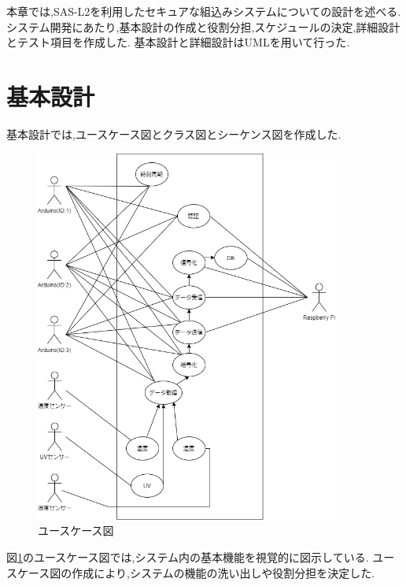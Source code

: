 
本章では,SAS-L2を利用したセキュアな組込みシステムについての設計を述べる.
システム開発にあたり,基本設計の作成と役割分担,スケジュールの決定,詳細設計とテスト項目を作成した.
基本設計と詳細設計はUMLを用いて行った.

\section{基本設計}
基本設計では,ユースケース図とクラス図とシーケンス図を作成した.
\begin{figure}[H]
\begin{center}
	\includegraphics[width=10cm]{usecase.png}
	\caption{ユースケース図}
	\label{fig:kihon_usecase}
\end{center}
\end{figure}

図\ref{fig:kihon_usecase}のユースケース図では,システム内の基本機能を視覚的に図示している.
ユースケース図の作成により,システムの機能の洗い出しや役割分担を決定した.

